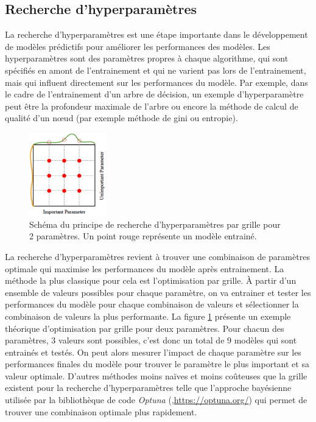 \subsection{Recherche d'hyperparamètres}
La recherche d'hyperparamètres est une étape importante dans le développement de modèles prédictifs pour améliorer les performances des modèles. Les hyperparamètres sont des paramètres propres à chaque algorithme, qui sont spécifiés en amont de l'entrainement et qui ne varient pas lors de l'entrainement, mais qui influent directement sur les performances du modèle. Par exemple, dans le cadre de l'entrainement d'un arbre de décision, un exemple d'hyperparamètre peut être la profondeur maximale de l'arbre ou encore la méthode de calcul de qualité d'un nœud (par exemple méthode de gini ou entropie).
\begin{figure}[!ht]
 \centering
 \includegraphics[width=0.3\textwidth]{figures/parameters_grid.png}
 \caption[Schéma rechercher hyper-paramètres]{Schéma du principe de recherche d'hyperparamètres par grille pour 2 paramètres. Un point rouge représente un modèle entrainé. }
 \label{fig:params_grid}
\end{figure}
La recherche d'hyperparamètres revient à trouver une combinaison de paramètres optimale qui maximise les performances du modèle après entrainement. La méthode la plus classique pour cela est l'optimisation par grille. À partir d'un ensemble de valeurs possibles pour chaque paramètre, on va entrainer et tester les performances du modèle pour chaque combinaison de valeurs et sélectionner la combinaison de valeurs la plus performante. La figure \ref{fig:params_grid}  présente un exemple théorique d'optimisation par grille pour deux paramètres. Pour chacun des paramètres, 3 valeurs sont possibles, c'est donc un total de 9 modèles qui sont entrainés et testés. On peut alors mesurer l'impact de chaque paramètre sur les performances finales du modèle pour trouver le paramètre le plus important et sa valeur optimale.
D'autres méthodes moins naïves et moins coûteuses que la grille existent pour la recherche d'hyperparamètres telle que l'approche bayésienne utilisée par la bibliothèque de code \textit{Optuna} (\cite{akiba_optuna_2019},\href{https://optuna.org/}{https://optuna.org/}) qui permet de trouver une combinaison optimale plus rapidement.

